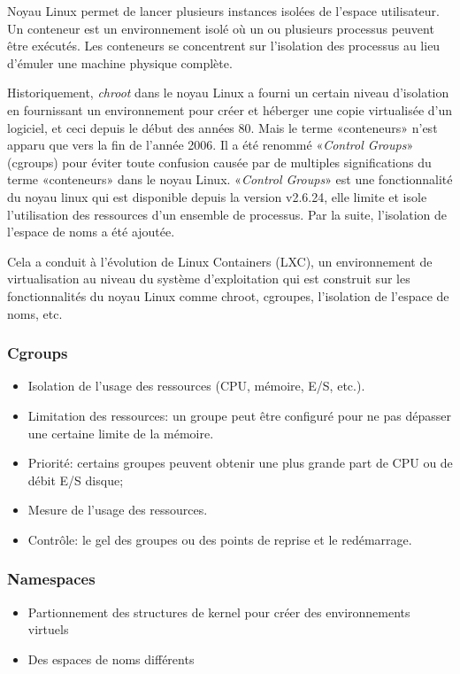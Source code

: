 \begin{onehalfspace}
Noyau Linux permet de lancer plusieurs instances isolées de l'espace utilisateur. Un conteneur est un environnement isolé où un ou plusieurs processus peuvent être exécutés. Les conteneurs se concentrent sur l'isolation des processus au lieu d'émuler une machine physique complète.

Historiquement, \emph{chroot} dans le noyau Linux a fourni un certain niveau d'isolation en fournissant un environnement pour créer et héberger une copie virtualisée d'un logiciel, et ceci depuis le début des années 80. Mais le terme «conteneurs» n'est apparu que vers la fin de l'année 2006. Il a été renommé «\emph{Control Groups}» (cgroups) pour éviter toute confusion causée par de multiples significations du terme «conteneurs» dans le noyau Linux. «\emph{Control Groups}» est une fonctionnalité du noyau linux qui est disponible depuis la version v2.6.24, elle limite et isole l'utilisation des ressources d'un ensemble de processus. Par la suite, l'isolation de l'espace de noms a été ajoutée.

Cela a conduit à l'évolution de Linux Containers (LXC), un environnement de virtualisation au niveau du système d'exploitation qui est construit sur les fonctionnalités du noyau Linux comme chroot, cgroupes, l'isolation de l'espace de noms, etc.

\subsubsection*{Cgroups}

\begin{itemize}
\item Isolation de l'usage des ressources (CPU, mémoire, E/S, etc.).
\item Limitation des ressources: un groupe peut être configuré pour ne pas dépasser une certaine limite de la mémoire.
\item Priorité: certains groupes peuvent obtenir une plus grande part de CPU ou de débit E/S disque;
\item Mesure de l'usage des ressources.
\item Contrôle: le gel des groupes ou des points de reprise et le redémarrage.
\end{itemize}

\subsubsection*{Namespaces}
\begin{itemize}
\item Partionnement des structures de kernel pour créer des environnements virtuels
\item Des espaces de noms différents


\end{itemize}
\end{onehalfspace}
